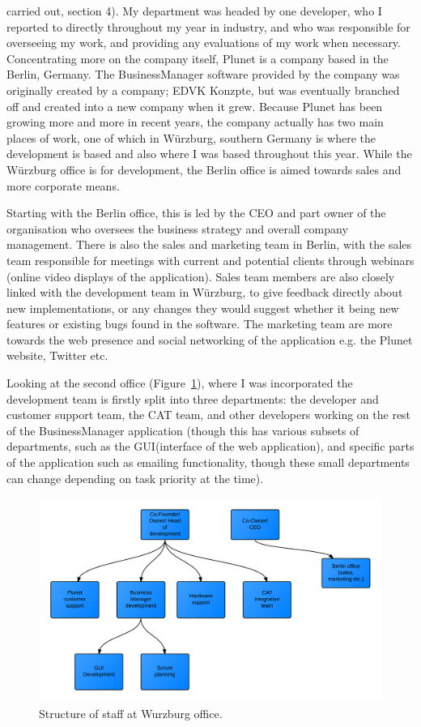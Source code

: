 \documentclass[12pt]{article}
\begin{document}
carried out, section 4). My department was headed by one developer, who I reported to directly throughout my year in
industry, and who was responsible for overseeing my work, and providing any evaluations of my work when necessary.
Concentrating more on the company itself, Plunet is a company based in the Berlin, Germany. The BusinessManager software
provided by the company was originally created by a company; EDVK Konzpte, but was eventually branched off and created
into a new company when it grew. Because Plunet has been growing more and more in recent years, the company actually has
two main places of work, one of which in Würzburg, southern Germany is where the development is based and also where I
was based throughout this year. While the Würzburg office is for development, the Berlin office is aimed towards sales
and more corporate means.\\ \par \noindent
Starting with the Berlin office, this is led by the CEO and part owner of the organisation who oversees the business
strategy and overall company management. There is also the sales and marketing team in Berlin, with the sales team
responsible for meetings with current and potential clients through webinars (online video displays of the application).
Sales team members are also closely linked with the development team in Würzburg, to give feedback directly about new
implementations, or any changes they would suggest whether it being new features or existing bugs found in the software.
The marketing team are more towards the web presence and social networking of the application e.g. the Plunet website,
Twitter etc.\\ \par \noindent
Looking at the second office (Figure~\ref{fig:test}), where I was incorporated the development team is firstly split into three departments: the
developer and customer support team, the CAT team, and other developers working on the rest of the BusinessManager
application (though this has various subsets of departments, such as the GUI(interface of the web application), and
specific parts of the application such as emailing functionality, though these small departments can change depending on
task priority at the time).

\begin{figure}[ht]
    \includegraphics[scale=0.2]{ranks}
    \caption{Structure of staff at Wurzburg office.}
     \label{fig:test}
\end{figure}
\end{document}
